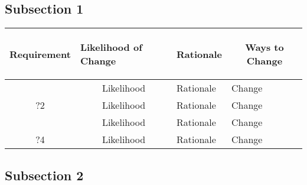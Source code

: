 \documentclass [11pt]{article}
\begin{document}
\subsection{Subsection 1}

\begin{longtable}{| p{ } | p{ } |  p{ } | p{ } |}\hline 
\multicolumn{1}{|c|}{\textbf {Requirement}} & 
\begin{minipage}{.14 \columnwidth}\begin{center}\vspace{1.5mm}\textbf{Likelihood of Change}   \vspace{1.5mm} \end{center}\end{minipage}& 
\multicolumn{1}{c|}{\textbf {Rationale}} & \multicolumn{1}{c|}{\textbf {Ways to Change}} \\ \hline

\rowcolor{tableCell} \multicolumn{1}{|c|}{?1}& 
\multicolumn{1}{|c|}{Likelihood} & Rationale & Change \\ \hline

\multicolumn{1}{|c|}{?2}& 
\multicolumn{1}{|c|}{Likelihood} & Rationale & Change \\ \hline

\rowcolor{tableCell} \multicolumn{1}{|c|}{?3}& 
\multicolumn{1}{|c|}{Likelihood} & Rationale & Change \\ \hline

\multicolumn{1}{|c|}{?4}& 
\multicolumn{1}{|c|}{Likelihood} & Rationale & Change \\ \hline
\end{longtable}

\subsection{Subsection 2}
\end{document}

